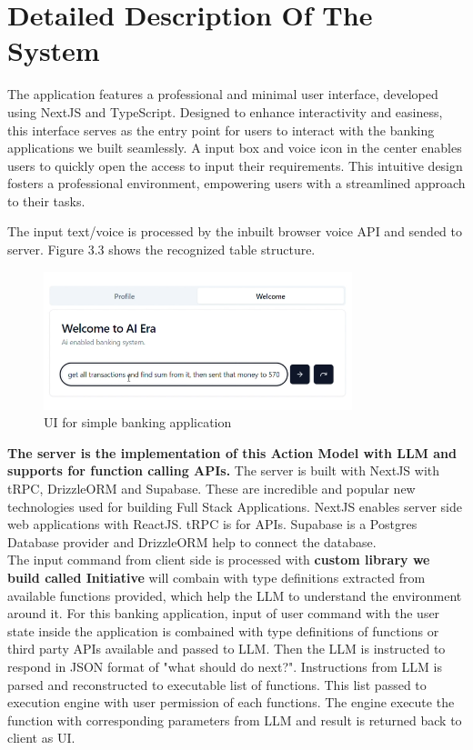 \clearpage

\section{Detailed Description Of The System}

\noindent
The application features a professional and minimal user interface, developed using NextJS and TypeScript. Designed to enhance interactivity and easiness, this interface serves as the entry point for users to interact with the banking applications we built seamlessly. A input box and voice icon in the center enables users to quickly open the access to input their requirements. This intuitive design fosters a professional environment, empowering users with a streamlined approach to their tasks.

\noindent The input text/voice is processed by the inbuilt browser voice API and sended to server. Figure 3.3 shows the recognized table structure.

\begin{figure}[h!]
    \centering
    \includegraphics[width=0.8\textwidth]{Images/prop_sys/ui_for_bank_app.png}
    \caption{UI for simple banking application}
\end{figure}

\noindent \textbf{The server is the implementation of this Action Model with LLM and supports for function calling APIs.} The server is built with NextJS with tRPC, DrizzleORM and Supabase. These are incredible and popular new technologies used for building Full Stack Applications. NextJS enables server side web applications with ReactJS. tRPC is for APIs. Supabase is a Postgres Database provider and DrizzleORM help to connect the database.\\ 

\noindent The input command from client side is processed with \textbf{custom library we build called Initiative} will combain with type definitions extracted from available functions provided, which help the LLM to understand the environment around it. For this banking application, input of user command with the user state inside the application is combained with type definitions of functions or third party APIs available and passed to LLM. Then the LLM is instructed to respond in JSON format of "what should do next?". Instructions from LLM is parsed and reconstructed to executable list of functions. This list passed to execution engine with user permission of each functions. The engine execute the function with corresponding parameters from LLM and result is returned back to client as UI.

